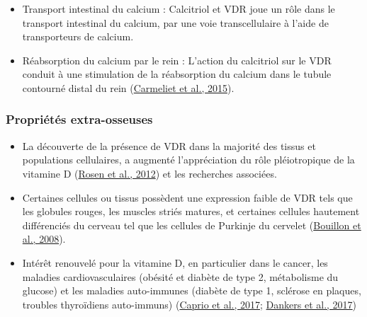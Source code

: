 \documentclass[
  letterpaper,
  DIV=11,
  numbers=noendperiod]{scrartcl}
\begin{document}
\begin{itemize}
\item
  Transport intestinal du calcium : Calcitriol et VDR joue un rôle dans
  le transport intestinal du calcium, par une voie transcellulaire à
  l'aide de transporteurs de calcium.
\item
  Réabsorption du calcium par le rein : L'action du calcitriol sur le
  VDR conduit à une stimulation de la réabsorption du calcium dans le
  tubule contourné distal du rein
  (\protect\hyperlink{ref-Carmeliet.2015}{Carmeliet et al., 2015}).
\end{itemize}

\hypertarget{propriuxe9tuxe9s-extra-osseuses}{%
\subsubsection{Propriétés
extra-osseuses}\label{propriuxe9tuxe9s-extra-osseuses}}

\begin{itemize}
\item
  La découverte de la présence de VDR dans la majorité des tissus et
  populations cellulaires, a augmenté l'appréciation du rôle
  pléiotropique de la vitamine D
  (\protect\hyperlink{ref-Rosen.2012}{Rosen et al., 2012}) et les
  recherches associées.
\item
  Certaines cellules ou tissus possèdent une expression faible de VDR
  tels que les globules rouges, les muscles striés matures, et certaines
  cellules hautement différenciés du cerveau tel que les cellules de
  Purkinje du cervelet (\protect\hyperlink{ref-Bouillon.2008}{Bouillon
  et al., 2008}).
\item
  Intérêt renouvelé pour la vitamine D, en particulier dans le cancer,
  les maladies cardiovasculaires (obésité et diabète de type 2,
  métabolisme du glucose) et les maladies auto-immunes (diabète de type
  1, sclérose en plaques, troubles thyroïdiens auto-immuns)
  (\protect\hyperlink{ref-Caprio.2017}{Caprio et al., 2017};
  \protect\hyperlink{ref-Dankers.2017}{Dankers et al., 2017})
\end{itemize}
\end{document}
